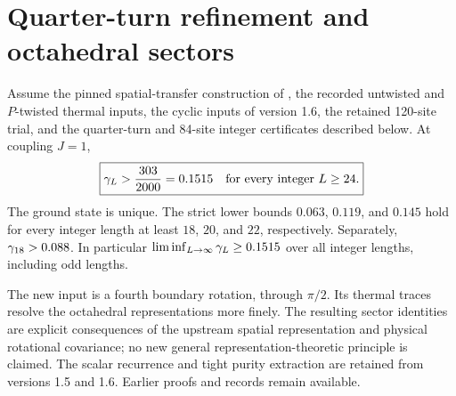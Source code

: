 \section{Quarter-turn refinement and octahedral sectors}
\label{sec:quarter}
\begin{theorem}\label{thm:quarter}
Assume the pinned spatial-transfer construction of \cite{upstream}, the
recorded untwisted and $P$-twisted thermal inputs, the cyclic inputs of
version 1.6, the retained 120-site trial, and the quarter-turn and
84-site integer certificates described below. At coupling $J=1$,
\[
 \boxed{\gamma_L>\frac{303}{2000}=0.1515
 \quad\text{for every integer }L\ge24.}
\]
The ground state is unique. The strict lower bounds $0.063$, $0.119$,
and $0.145$ hold for every integer length at least $18$, $20$, and $22$,
respectively. Separately, $\gamma_{18}>0.088$.
In particular $\liminf_{L\to\infty}\gamma_L\ge0.1515$ over all integer
lengths, including odd lengths.
\end{theorem}
The new input is a fourth boundary rotation, through $\pi/2$. Its
thermal traces resolve the octahedral representations more finely.
The resulting sector identities are explicit consequences of the
upstream spatial representation and physical rotational covariance;
no new general representation-theoretic principle is claimed.
The scalar recurrence and tight purity extraction are retained from
versions 1.5 and 1.6. Earlier proofs and records remain available.

